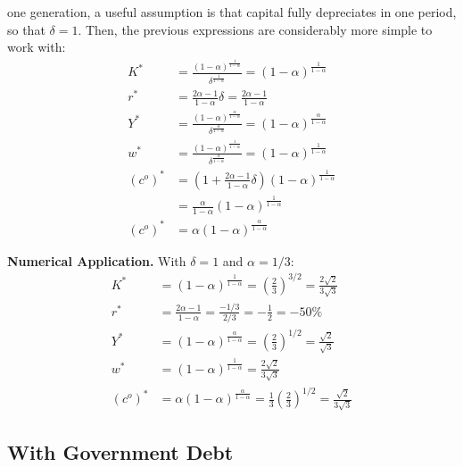 \documentclass[]{book}
\begin{document}
one generation, a useful assumption is that capital fully depreciates in
one period, so that \(\delta = 1\). Then, the previous expressions are
considerably more simple to work with: \[
\begin{aligned}
K^{*}&=\frac{(1-\alpha)^{\frac{1}{1-\alpha}}}{\delta^{\frac{1}{1-\alpha}}}=(1-\alpha)^{\frac{1}{1-\alpha}}\\
r^{*}&=\frac{2\alpha-1}{1-\alpha}\delta = \frac{2\alpha-1}{1-\alpha}\\
Y^{*}&=\frac{(1-\alpha)^{\frac{\alpha}{1-\alpha}}}{\delta^{\frac{\alpha}{1-\alpha}}} = (1-\alpha)^{\frac{\alpha}{1-\alpha}}\\
w^{*} &= \frac{\left(1-\alpha\right)^{\frac{1}{1-\alpha}}}{\delta^{\frac{\alpha}{1-\alpha}}} = (1-\alpha)^{\frac{1}{1-\alpha}}\\
(c^{o})^{*}&=\left(1+ \frac{2\alpha-1}{1-\alpha}\delta\right)\left(1-\alpha\right)^{\frac{1}{1-\alpha}}\\
&=\frac{\alpha}{1-\alpha}\left(1-\alpha\right)^{\frac{1}{1-\alpha}}\\
(c^{o})^{*}&= \alpha\left(1-\alpha\right)^{\frac{\alpha}{1-\alpha}}
\end{aligned}
\]

\textbf{Numerical Application.} With \(\delta = 1\) and
\(\alpha = 1/3\): \[
\begin{aligned}
K^{*}&=(1-\alpha)^{\frac{1}{1-\alpha}}=\left(\frac{2}{3}\right)^{3/2}=\frac{2\sqrt{2}}{3\sqrt{3}}\\
r^{*}&=\frac{2\alpha-1}{1-\alpha}=\frac{-1/3}{2/3}=-\frac{1}{2}=-50\%\\
Y^{*}&=(1-\alpha)^{\frac{\alpha}{1-\alpha}} = \left(\frac{2}{3}\right)^{1/2}=\frac{\sqrt{2}}{\sqrt{3}}\\
w^{*}&=\left(1-\alpha\right)^{\frac{1}{1-\alpha}} =\frac{2\sqrt{2}}{3\sqrt{3}}\\
(c^{o})^{*}&=\alpha\left(1-\alpha\right)^{\frac{\alpha}{1-\alpha}}=\frac{1}{3} \left(\frac{2}{3}\right)^{1/2}=\frac{\sqrt{2}}{3\sqrt{3}}
\end{aligned}
\]

\subsection{With Government Debt}\label{with-government-debt}
\end{document}
